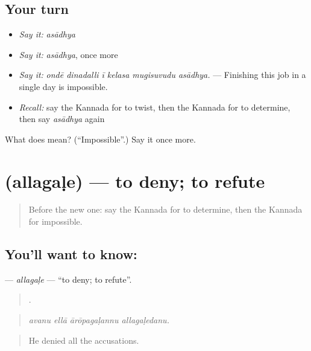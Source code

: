 \subsection*{Your turn}
\begin{itemize}
\raggedright
  \item \emph{Say it:} \emph{asādhya}
  \item \emph{Say it:} \emph{asādhya}, once more
  \item \emph{Say it:} \emph{ondē dinadalli ī kelasa mugisuvudu asādhya.} — Finishing this job in a single day is impossible.
  \item \emph{Recall:} say the Kannada for to twist, then the Kannada for to determine, then say \emph{asādhya} again
\end{itemize}

\begin{tcolorbox}[breakable,colback=teal!4,colframe=teal!35!black,title={Before you move on}]
What does  mean? (\textquotedblleft{}Impossible\textquotedblright{}.) Say it once more.
\end{tcolorbox}
\section[\texorpdfstring{\kn{ಅಲ್ಲಗಳೆ} (allagaḷe)}{ಅಲ್ಲಗಳೆ (allagaḷe)}]{ (allagaḷe) — to deny; to refute}

\label{lesson:KA-C383-allagale}



\begin{quote}
Before the new one: say the Kannada for to determine, then the Kannada for impossible.
\end{quote}

\subsection*{You'll want to know: }
\textbf{} — \emph{allagaḷe} — \textquotedblleft{}to deny; to refute\textquotedblright{}.

\begin{quote}
   .
\end{quote}

\begin{quote}
\emph{avanu ellā ārōpagaḷannu allagaḷedanu.}
\end{quote}

\begin{quote}
He denied all the accusations.
\end{quote}

